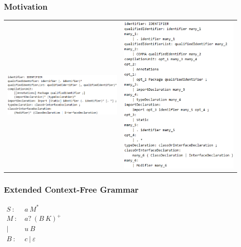 \documentclass{beamer}
\begin{document}
	\begin{frame} 
		\frametitle{Motivation} 
		\begin{tabular}{p{6cm} | p{6cm}}
			{\includegraphics[width=6cm]{pictures/java_before.png}} 
			&
			{\includegraphics[width=6cm]{pictures/java_after.png}} 
	    \end{tabular}

	\end{frame}


	\begin{frame} 
		\frametitle{Extended Context-Free Grammar}
		{$\begin{aligned}
			S\ :&\ a\ M^* \\
			M\ :&\ a?\ (B\ K)^+ \\
			   |&\ u\ B \\
			B\ :&\ c\ |\ \varepsilon
			\end{aligned}$}
		

	\end{frame}
\end{document}

